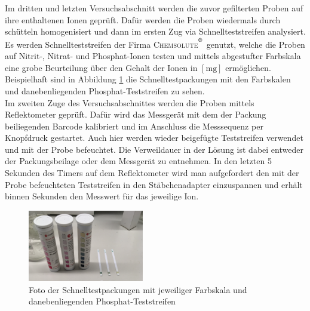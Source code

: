 Im dritten und letzten Versuchsabschnitt werden die zuvor gefilterten Proben auf ihre enthaltenen Ionen geprüft. Dafür werden die Proben wiedermals durch schütteln homogenisiert und dann im ersten Zug via Schnellteststreifen analysiert. Es werden Schnellteststreifen der Firma \textsc{Chemsolute$^{\textsuperscript{\textregistered}}$} genutzt, welche die Proben auf Nitrit-, Nitrat- und Phosphat-Ionen testen und mittels abgestufter Farbskala eine grobe Beurteilung über den Gehalt der Ionen in $\left[\si{\milli \gram}\right]$ ermöglichen. Beispielhaft sind in Abbildung \ref{fig:phosphat_test} die Schnelltestpackungen mit den Farbskalen und danebenliegenden Phosphat-Teststreifen zu sehen.\\
Im zweiten Zuge des Versuchsabschnittes werden die Proben mittels Reflektometer geprüft. Dafür wird das Messgerät mit dem der Packung beiliegenden Barcode kalibriert und im Anschluss die Messsequenz per Knopfdruck gestartet. Auch hier werden wieder beigefügte Teststreifen verwendet und mit der Probe befeuchtet. Die Verweildauer in der Lösung ist dabei entweder der Packungsbeilage oder dem Messgerät zu entnehmen. In den letzten 5 Sekunden des Timers auf dem Reflektometer wird man aufgefordert den mit der Probe befeuchteten Teststreifen in den Stäbchenadapter einzuspannen und erhält binnen Sekunden den Messwert für das jeweilige Ion.
\begin{figure}[h!]
	\centering
	\includegraphics[width=0.45\textwidth]{img/phosphat}
	\caption{Foto der Schnelltestpackungen mit jeweiliger Farbskala und danebenliegenden Phosphat-Teststreifen}
	\label{fig:phosphat_test}
\end{figure}
\FloatBarrier
